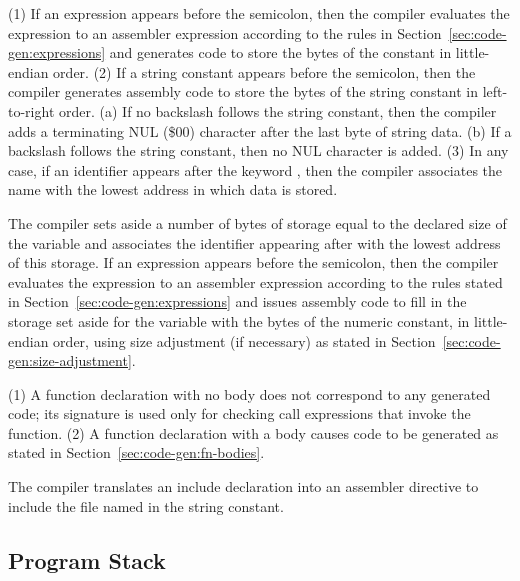\documentclass[10pt]{article}
\begin{document}
 (1) If an expression appears before the
semicolon, then the compiler evaluates the expression to an assembler
expression according to the rules in
Section~\ref{sec:code-gen:expressions} and generates code to store the
bytes of the constant in little-endian order.  (2) If a string
constant appears before the semicolon, then the compiler generates
assembly code to store the bytes of the string constant in
left-to-right order.  (a) If no backslash \kwd{\bs} follows the string
constant, then the compiler adds a terminating NUL (\$00) character
after the last byte of string data. (b) If a backslash follows the
string constant, then no NUL character is added.  (3) In any case, if
an identifier appears after the keyword , then the compiler
associates the name with the lowest address in which data is stored.

 The compiler sets aside a number
of bytes of storage equal to the declared size of the variable and
associates the identifier appearing after  with the lowest
address of this storage.  If an expression appears before the
semicolon, then the compiler evaluates the expression to an assembler
expression according to the rules stated in
Section~\ref{sec:code-gen:expressions} and issues assembly code to
fill in the storage set aside for the variable with the bytes of the
numeric constant, in little-endian order, using size adjustment (if
necessary) as stated in Section~\ref{sec:code-gen:size-adjustment}.

 (1) A function declaration with no
body does not correspond to any generated code; its signature is used
only for checking call expressions that invoke the function.  (2) A
function declaration with a body causes code to be generated as stated
in Section~\ref{sec:code-gen:fn-bodies}.

  The compiler translates an include
declaration into an assembler directive to include the file named in
the string constant.

\subsection{Program Stack}
\label{sec:code-gen:program-stack}
\end{document}
